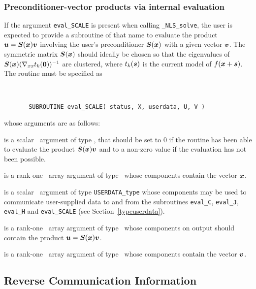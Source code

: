 \documentclass{galahad}
\newcommand{\packagename}{NLS}
\newcommand{\fullpackagename}{\libraryname\_\packagename}
\newcommand{\solver}{{\tt \fullpackagename\_solve}}
\begin{document}

\subsubsection{Preconditioner-vector products via internal evaluation\label{pv}}

If the argument {\tt eval\_SCALE} is present when calling \solver, the
user is expected to provide a subroutine of that name to evaluate the
product ${\bm{u}} = {\bm{S}}({\bm{x}}) {\bm{v}}$ involving the user's preconditioner
${\bm{S}}({\bm{x}})$ with a given vector ${\bm{v}}$. The symmetric matrix ${\bm{S}}({\bm{x}})$
should ideally be chosen so that the eigenvalues of
${\bm{S}}({\bm{x}}) (\nabla_{xx} t_k({\bm{0}}))^{-1}$ are clustered, where $t_k({\bm{s}})$
is the current model of $f({\bm{x}}+{\bm{s}})$.
The routine must be specified as

\def\baselinestretch{0.8}
{\tt
\begin{verbatim}
       SUBROUTINE eval_SCALE( status, X, userdata, U, V )
\end{verbatim} }
\def\baselinestretch{1.0}
\noindent whose arguments are as follows:

\begin{description}
 is a scalar \intentout\ argument of type \integer,
that should be set to 0 if the routine has been able to evaluate the
product ${\bm{S}}({\bm{x}}) {\bm{v}}$
and to a non-zero value if the evaluation has not been possible.

 is a rank-one \intentin\ array argument of type \realdp\
whose components contain the vector ${\bm{x}}$.

 is a scalar \intentinout\ argument of type
{\tt USERDATA\_type} whose components may be used
to communicate user-supplied data to and from the
subroutines {\tt eval\_C}, {\tt eval\_J},
{\tt eval\_H} and {\tt eval\_SCALE}
(see Section~\ref{typeuserdata}).

 is a rank-one \intentout\ array argument of type \realdp\
whose components on output should contain the product ${\bm{u}} = {\bm{S}}({\bm{x}}) {\bm{v}}$.

\ittf{V} is a rank-one \intentin\ array argument of type \realdp\
whose components contain the vector ${\bm{v}}$.

\end{description}


\subsection{\label{reverse}Reverse Communication Information}
\end{document}
